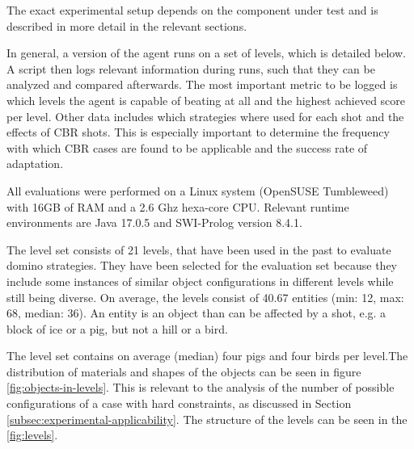 The exact experimental setup depends on the component under test and is described in more detail in the relevant sections.

In general, a version of the agent runs on a set of levels, which is detailed below.
A script then logs relevant information during runs, such that they can be analyzed and compared afterwards.
The most important metric to be logged is which levels the agent is capable of beating at all and the highest achieved score per level.
Other data includes which strategies where used for each shot and the effects of \ac{CBR} shots.
This is especially important to determine the frequency with which \acs{CBR} cases are found to be applicable and the success rate of adaptation.

All evaluations were performed on a Linux system (OpenSUSE Tumbleweed) with 16GB of RAM and a 2.6 Ghz hexa-core CPU. Relevant runtime environments are Java 17.0.5 and SWI-Prolog version 8.4.1.

The level set consists of 21 levels, that have been used in the past to evaluate domino strategies. They have been selected for the evaluation set because they include some instances of similar object configurations in different levels while still being diverse.
On average, the levels consist of 40.67 entities (min: 12, max: 68, median: 36). An entity is an object than can be affected by a shot, e.g. a block of ice or a pig, but not a hill or a bird.

The level set contains on average (median) four pigs and four birds per level.The distribution of materials and shapes of the objects can be seen in figure \ref{fig:objects-in-levels}. This is relevant to the analysis of the number of possible configurations of a case with hard constraints, as discussed in Section \ref{subsec:experimental-applicability}.
The structure of the levels can be seen in the \ref{fig:levels}.

